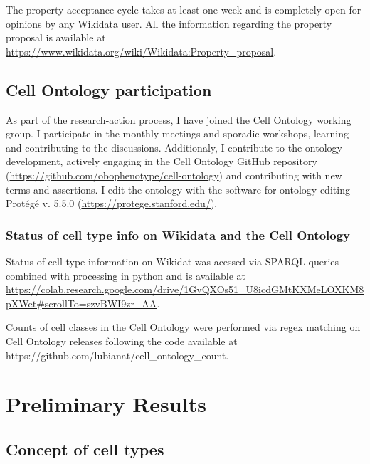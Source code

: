 The property acceptance cycle takes at least one week and is completely open for opinions by any Wikidata user. All the information regarding the property proposal is available at \url{https://www.wikidata.org/wiki/Wikidata:Property_proposal}.

\hypertarget{cell-ontology-participation}{%
\subsection{Cell Ontology participation}\label{cell-ontology-participation}}

As part of the research-action process, I have joined the Cell Ontology working group.
I participate in the monthly meetings and sporadic workshops, learning and contributing to the discussions.
Additionaly, I contribute to the ontology development, actively engaging in the Cell Ontology GitHub repository (\url{https://github.com/obophenotype/cell-ontology}) and contributing with new terms and assertions.
I edit the ontology with the software for ontology editing Protégé v. 5.5.0 (\url{https://protege.stanford.edu/}).

\hypertarget{status-of-cell-type-info-on-wikidata-and-the-cell-ontology}{%
\subsubsection{Status of cell type info on Wikidata and the Cell Ontology}\label{status-of-cell-type-info-on-wikidata-and-the-cell-ontology}}

Status of cell type information on Wikidat was acessed via SPARQL queries combined with processing in python and is available at \url{https://colab.research.google.com/drive/1GvQXOs51_U8icdGMtKXMeLOXKM8pXWet\#scrollTo=szvBWI9zr_AA}.

Counts of cell classes in the Cell Ontology were performed via regex matching on Cell Ontology releases following the code available at https://github.com/lubianat/cell\_ontology\_count.

\hypertarget{preliminary-results}{%
\section{Preliminary Results}\label{preliminary-results}}

\hypertarget{concept-of-cell-types}{%
\subsection{Concept of cell types}\label{concept-of-cell-types}}

